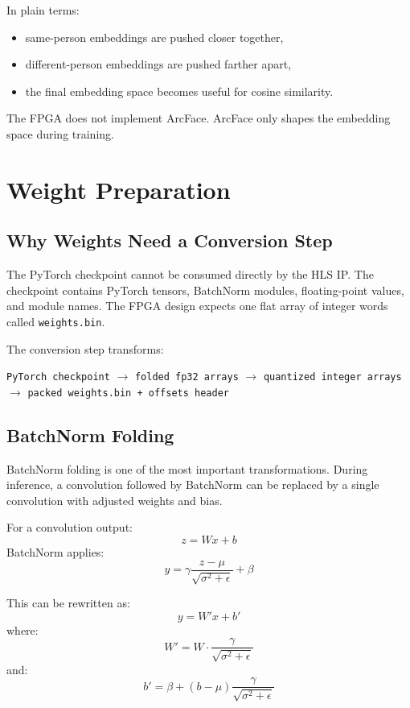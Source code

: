 \documentclass[11pt]{article}
\newcommand{\code}[1]{\texttt{#1}}
\begin{document}
In plain terms:

\begin{itemize}[leftmargin=1.4em]
  \item same-person embeddings are pushed closer together,
  \item different-person embeddings are pushed farther apart,
  \item the final embedding space becomes useful for cosine similarity.
\end{itemize}

The FPGA does not implement ArcFace.
ArcFace only shapes the embedding space during training.

\section{Weight Preparation}

\subsection{Why Weights Need a Conversion Step}

The PyTorch checkpoint cannot be consumed directly by the HLS IP.
The checkpoint contains PyTorch tensors, BatchNorm modules, floating-point values, and module names.
The FPGA design expects one flat array of integer words called \code{weights.bin}.

The conversion step transforms:

\begin{center}
\code{PyTorch checkpoint} \(\rightarrow\)
\code{folded fp32 arrays} \(\rightarrow\)
\code{quantized integer arrays} \(\rightarrow\)
\code{packed weights.bin + offsets header}
\end{center}

\subsection{BatchNorm Folding}

BatchNorm folding is one of the most important transformations.
During inference, a convolution followed by BatchNorm can be replaced by a single convolution with adjusted weights and bias.

For a convolution output:
\[
  z = W x + b
\]
BatchNorm applies:
\[
  y = \gamma \frac{z - \mu}{\sqrt{\sigma^2 + \epsilon}} + \beta
\]

This can be rewritten as:
\[
  y = W' x + b'
\]
where:
\[
  W' = W \cdot \frac{\gamma}{\sqrt{\sigma^2 + \epsilon}}
\]
and:
\[
  b' = \beta + (b - \mu)\frac{\gamma}{\sqrt{\sigma^2 + \epsilon}}
\]
\end{document}

